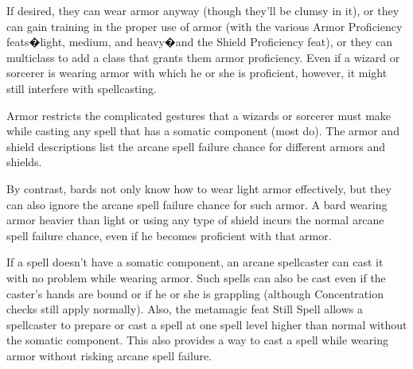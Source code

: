 \smallskip\noindent If desired, they can wear armor anyway (though they'll be clumsy in it), or they can gain training in the proper use of armor (with the various Armor Proficiency feats�light, medium, and heavy�and the Shield Proficiency feat), or they can multiclass to add a class that grants them armor proficiency. Even if a wizard or sorcerer is wearing armor with which he or she is proficient, however, it might still interfere with spellcasting.

\smallskip\noindent Armor restricts the complicated gestures that a wizards or sorcerer must make while casting any spell that has a somatic component (most do). The armor and shield descriptions list the arcane spell failure chance for different armors and shields.

\smallskip\noindent By contrast, bards not only know how to wear light armor effectively, but they can also ignore the arcane spell failure chance for such armor. A bard wearing armor heavier than light or using any type of shield incurs the normal arcane spell failure chance, even if he becomes proficient with that armor.

\smallskip\noindent If a spell doesn't have a somatic component, an arcane spellcaster can cast it with no problem while wearing armor. Such spells can also be cast even if the caster's hands are bound or if he or she is grappling (although Concentration checks still apply normally). Also, the metamagic feat Still Spell allows a spellcaster to prepare or cast a spell at one spell level higher than normal without the somatic component. This also provides a way to cast a spell while wearing armor without risking arcane spell failure. 